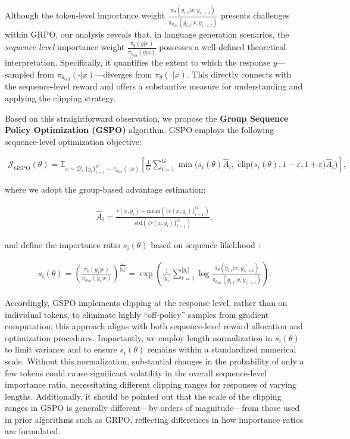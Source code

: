 Although the token-level importance weight $\frac{ \pi_{\theta} (y_{i,t} | x, y_{i,<t}) }{ \pi_{\theta_\text{old}} (y_{i,t} | x,y_{i,<t})}$ presents challenges within GRPO, our analysis reveals that, in language generation scenarios, the \textit{sequence-level} importance weight $\frac{ \pi_{\theta} (y | x) }{ \pi_{\theta_\text{old}} (y | x)}$ possesses a well-defined theoretical interpretation. Specifically, it quantifies the extent to which the response $y$—sampled from $\pi_{\theta_\text{old}} (\cdot | x)$—diverges from $\pi_{\theta} (\cdot | x)$. This directly connects with the sequence-level reward and offers a substantive measure for understanding and applying the clipping strategy.

Based on this straightforward observation, we propose the \textbf{Group Sequence Policy Optimization (GSPO)} algorithm. GSPO employs the following sequence-level optimization objective:

\begin{align}
\mathcal{J}_\text{GSPO} (\theta) =
\mathbb{E}_{ x \sim \mathcal{D},\, \{y_i\}_{i=1}^G \sim \pi_{\theta_\text{old}}( \cdot | x) }
\left[ 
\frac{1}{G} \sum_{i=1}^{G}
\min \Big( s_{i}(\theta)  \widehat{A}_{i}, \; \mathrm{clip} \big( s_{i}(\theta), 1 - {\varepsilon}, 1 + {\varepsilon} \big) \widehat{A}_{i} \Big) 
\right],
\label{equ:gspo}
\end{align}

where we adopt the group-based advantage estimation:

\begin{align}
\widehat{A}_{i} = \frac{r(x, y_i) - \mathrm{mean} \left( \{ r(x, y_i) \}_{i=1}^G \right) }{ \mathrm{std} \left( \{ r(x, y_i) \}_{i=1}^G \right) },
\end{align}

and define the importance ratio $s_{i}(\theta)$ based on sequence likelihood \citep{click}:

\begin{align}
s_{i}(\theta) = \left( \frac{ \pi_{\theta} (y_i | x) }{ \pi_{\theta_\text{old}} (y_i | x)} \right)^{\frac{1}{|y_i|}}
=
\exp \left( \frac{1}{|y_i|} \sum_{t=1}^{|y_i|} \log \frac{ \pi_{\theta} (y_{i,t} | x, y_{i,<t}) }{ \pi_{\theta_\text{old}} (y_{i,t} | x, y_{i,<t}) } \right).
\end{align}

Accordingly, GSPO implements clipping at the response level, rather than on individual tokens, to eliminate highly “off-policy” samples from gradient computation; this approach aligns with both sequence-level reward allocation and optimization procedures. Importantly, we employ length normalization in $s_{i}(\theta)$ to limit variance and to ensure $s_{i}(\theta)$ remains within a standardized numerical scale. Without this normalization, substantial changes in the probability of only a few tokens could cause significant volatility in the overall sequence-level importance ratio, necessitating different clipping ranges for responses of varying lengths. Additionally, it should be pointed out that the scale of the clipping ranges in GSPO is generally different—by orders of magnitude—from those used in prior algorithms such as GRPO, reflecting differences in how importance ratios are formulated.

